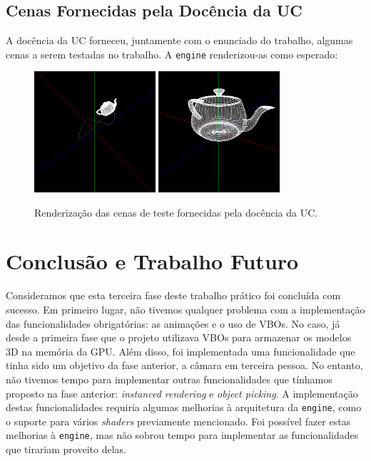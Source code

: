 \documentclass[12pt, a4paper]{article}
\begin{document}
\subsection{Cenas Fornecidas pela Docência da UC}

A docência da UC forneceu, juntamente com o enunciado do trabalho, algumas cenas a serem testadas no
trabalho. A \texttt{engine} renderizou-as como esperado:

\begin{figure}[H]
    \centering
    \includegraphics[width=0.4\textwidth]{res/phase3/results/Test1.png}
    \includegraphics[width=0.4\textwidth]{res/phase3/results/Test2.png}
    \caption{Renderização das cenas de teste fornecidas pela docência da UC.}
\end{figure}

\section{Conclusão e Trabalho Futuro}

Consideramos que esta terceira fase deste trabalho prático foi concluída com sucesso. Em primeiro
lugar, não tivemos qualquer problema com a implementação das funcionalidades obrigatórias: as
animações e o uso de VBOs. No caso, já desde a primeira fase que o projeto utilizava VBOs para
armazenar os modelos 3D na memória da GPU. Além disso, foi implementada uma funcionalidade que tinha
sido um objetivo da fase anterior, a câmara em terceira pessoa. No entanto, não tivemos tempo para
implementar outras funcionalidades que tínhamos proposto na fase anterior: \emph{instanced
rendering} e \emph{object picking}. A implementação destas funcionalidades requiria algumas
melhorias à arquitetura da \texttt{engine}, como o suporte para vários \emph{shaders} previamente
mencionado. Foi possível fazer estas melhorias à \texttt{engine}, mas não sobrou tempo para
implementar as funcionalidades que tirariam proveito delas.
\end{document}
